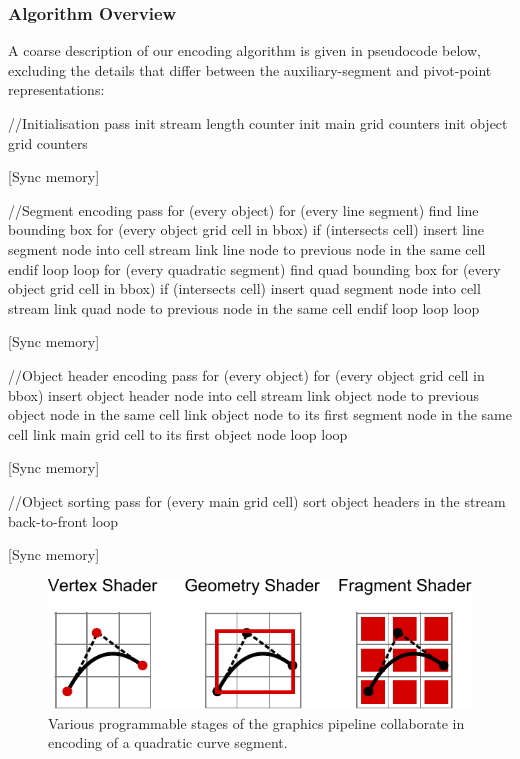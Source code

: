 \documentclass[11pt,a4paper,twoside]{article}
\newenvironment {code}{\footnotesize}{\normalsize}
\begin{document}
\subsubsection {Algorithm Overview}

A coarse description of our encoding algorithm is given in pseudocode below, excluding the details that differ between the auxiliary-segment and pivot-point representations:

\begin {code}
\begin {verbatimtab}[3]

//Initialisation pass
init stream length counter
init main grid counters
init object grid counters

[Sync memory]

//Segment encoding pass
for (every object)
	for (every line segment)
		find line bounding box
		for (every object grid cell in bbox)
			if (intersects cell)
				insert line segment node into cell stream
				link line node to previous node in the same cell
			endif
		loop
	loop
	for (every quadratic segment)
		find quad bounding box
		for (every object grid cell in bbox)
			if (intersects cell)
				insert quad segment node into cell stream
				link quad node to previous node in the same cell
			endif
		loop
	loop
loop

[Sync memory]

//Object header encoding pass
for (every object)
	for (every object grid cell in bbox)
		insert object header node into cell stream
		link object node to previous object node in the same cell
		link object node to its first segment node in the same cell
		link main grid cell to its first object node
	loop
loop

[Sync memory]

//Object sorting pass
for (every main grid cell)
	sort object headers in the stream back-to-front 
loop

[Sync memory]
\end {verbatimtab}
\end {code}

\begin {figure} 
	\centering
	\includegraphics[width=0.8\columnwidth] {figures/parallelism}
	\caption {Various programmable stages of the graphics pipeline collaborate in encoding of a quadratic curve segment.}
	\label {fig:parallelism}
\end {figure}
\end{document}
